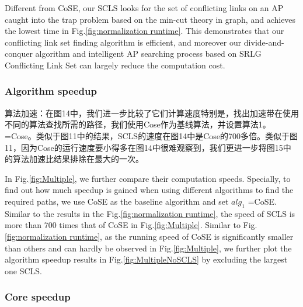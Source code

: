Different from CoSE, our SCLS looks for the set of conflicting links on an AP caught into the trap problem based on the min-cut theory in graph, and achieves the lowest time in Fig.\ref{fig:normalization runtime}. This demonstrates that our conflicting link set finding algorithm is efficient, and moreover our divide-and-conquer algorithm and intelligent AP searching process based on SRLG Conflicting Link Set can largely reduce the computation cost.


\subsubsection{Algorithm speedup}
算法加速：在图14中，我们进一步比较了它们计算速度特别是，找出加速带在使用不同的算法查找所需的路径，我们使用Cose作为基线算法，并设置算法1。=Cose。类似于图11中的结果，SCLS的速度在图14中是Cose的700多倍。类似于图11，因为Cose的运行速度要小得多在图14中很难观察到，我们更进一步将图15中的算法加速比结果排除在最大的一次。

In Fig.\ref{fig:Multiple}, we further compare their computation speeds. Specially, to find out how much speedup is gained when using different algorithms to find the required paths,
we use CoSE as the baseline algorithm and set $alg_1$ =CoSE. Similar to the results in the Fig.\ref{fig:normalization runtime}, the speed of SCLS is more than 700 times that of  CoSE in Fig.\ref{fig:Multiple}.  Similar to Fig.\ref{fig:normalization runtime}, as the running speed of CoSE is significantly smaller than others and can hardly be observed in Fig.\ref{fig:Multiple}, we further plot the algorithm speedup results in Fig.\ref{fig:MultipleNoSCLS} by excluding the largest one SCLS.



\subsubsection{Core speedup}

